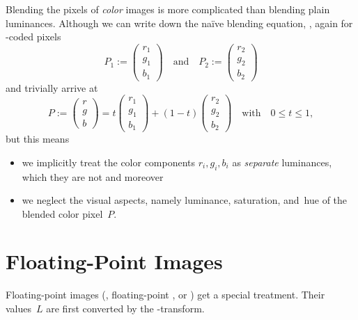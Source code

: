 Blending the pixels of \emph{color} images is more complicated than blending plain luminances.
Although we can write down the na\"ive blending equation, ,
again for -coded pixels
\[
  P_1 := \left(\begin{array}{c}r_1\\ g_1\\ b_1\end{array}\right)
  \quad \mbox{and}\quad
  P_2 := \left(\begin{array}{c}r_2\\ g_2\\ b_2\end{array}\right)
\]
and trivially arrive at
\begin{equation}\label{equ:trivial-rgb-blend}
  P :=
  \left(\begin{array}{c}r\\ g\\ b\end{array}\right) =
    t \left(\begin{array}{c}r_1\\ g_1\\ b_1\end{array}\right) +
    (1 - t) \left(\begin{array}{c}r_2\\ g_2\\ b_2\end{array}\right)
    \quad \mbox{with} \quad 0 \leq t \leq 1,
\end{equation}
but this means

\begin{itemize}
\item
  we implicitly treat the color components $r_i, g_i, b_i$ as \emph{separate} luminances, which
  they are not and moreover

\item
  we neglect the visual aspects, namely luminance, saturation, and~hue of the blended color
  pixel~$P$.
\end{itemize}


\section[Floating-Point Images]{\label{sec:floating-point-images}%
  Floating-Point Images}

%
%
%
%
%
%
%
%
%
%
Floating-point images (, floating-point , or ) get a
special treatment.  Their values~$L$ are first converted by the \LogTransform-transform.

